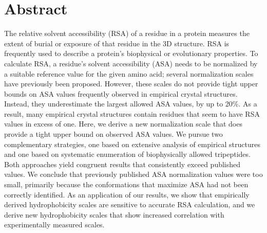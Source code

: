 \documentclass[11pt]{article}
\begin{document}
\section*{Abstract}
The relative solvent accessibility (RSA) of a residue in a protein measures the extent of burial or exposure of that residue in the 3D structure. RSA is frequently used to describe a protein's biophysical or evolutionary properties. To calculate RSA, a residue's solvent accessibility (ASA) needs to be normalized by a suitable reference value for the given amino acid; several normalization scales have previously been proposed. However, these scales do not provide tight upper bounds on ASA values frequently observed in empirical crystal structures. Instead, they underestimate the largest allowed ASA values, by up to 20\%. As a result, many empirical crystal structures contain residues that seem to have RSA values in excess of one. Here, we derive a new normalization scale that does provide a tight upper bound on observed ASA values. We pursue two complementary strategies, one based on extensive analysis of empirical structures and one based on systematic enumeration of biophysically allowed tripeptides. Both approaches yield congruent results that consistently exceed published values. We conclude that previously published ASA normalization values were too small, primarily because the conformations that maximize ASA had not been correctly identified. As an application of our results, we show that empirically derived hydrophobicity scales are sensitive to accurate RSA calculation, and we derive new hydrophobicity scales that show increased correlation with experimentally measured scales.

\end{document}

